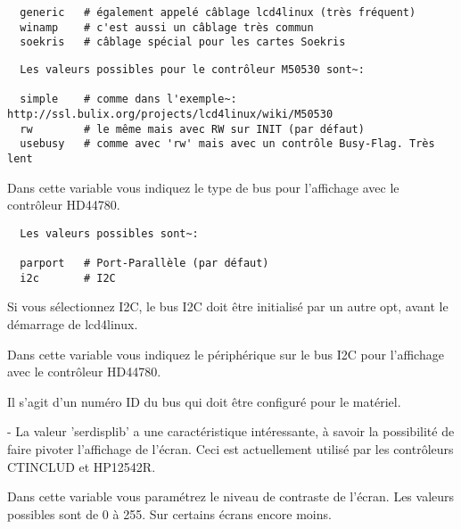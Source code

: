 \begin{description}
\begin{example}
\begin{verbatim}
  generic	# également appelé câblage lcd4linux (très fréquent)
  winamp	# c'est aussi un câblage très commun
  soekris	# câblage spécial pour les cartes Soekris
\end{verbatim}
\end{example}

\begin{example}
\begin{verbatim}
  Les valeurs possibles pour le contrôleur M50530 sont~:

  simple	# comme dans l'exemple~: http://ssl.bulix.org/projects/lcd4linux/wiki/M50530
  rw		# le même mais avec RW sur INIT (par défaut)
  usebusy	# comme avec 'rw' mais avec un contrôle Busy-Flag. Très lent
\end{verbatim}
\end{example}


  Dans cette variable vous indiquez le type de bus pour l'affichage avec le contrôleur
  HD44780.
  
\begin{example}
\begin{verbatim}
  Les valeurs possibles sont~:

  parport	# Port-Parallèle (par défaut)
  i2c		# I2C
\end{verbatim}
\end{example}

  Si vous sélectionnez I2C, le bus I2C doit être initialisé par un autre opt,
  avant le démarrage de lcd4linux.
  


  Dans cette variable vous indiquez le périphérique sur le bus I2C pour l'affichage
  avec le contrôleur HD44780.

  Il s'agit d'un numéro ID du bus qui doit être configuré pour le matériel.



  - La valeur 'serdisplib' a une caractéristique intéressante, à savoir la possibilité
  de faire pivoter l'affichage de l'écran. Ceci est actuellement utilisé par les contrôleurs
  CTINCLUD et HP12542R.


  Dans cette variable vous paramétrez le niveau de contraste de l'écran. Les valeurs possibles
  sont de 0 à 255. Sur certains écrans encore moins.


\end{description}
